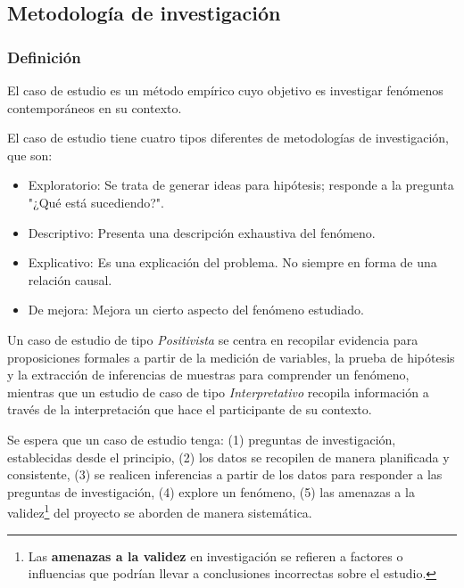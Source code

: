 \subsection{Metodología de investigación}
\subsubsection{Definición}
El caso de estudio es un método empírico cuyo objetivo es investigar fenómenos contemporáneos en su contexto.

El caso de estudio tiene cuatro tipos diferentes de metodologías de investigación, que son:
\begin{itemize}
    \item Exploratorio: Se trata de generar ideas para hipótesis; responde a la pregunta "¿Qué está sucediendo?".
    \item Descriptivo: Presenta una descripción exhaustiva del fenómeno.
    \item Explicativo: Es una explicación del problema.
    No siempre en forma de una relación causal.
    \item De mejora: Mejora un cierto aspecto del fenómeno estudiado.
\end{itemize}

Un caso de estudio de tipo \textit{Positivista} se centra en recopilar evidencia para proposiciones formales a partir de la medición de variables, la prueba de hipótesis y la extracción de inferencias de muestras para comprender un fenómeno, mientras que un estudio de caso de tipo \textit{Interpretativo} recopila información a través de la interpretación que hace el participante de su contexto.

Se espera que un caso de estudio tenga: (1) preguntas de investigación, establecidas desde el principio, (2) los datos se recopilen de manera planificada y consistente, (3) se realicen inferencias a partir de los datos para responder a las preguntas de investigación, (4) explore un fenómeno, (5) las amenazas a la validez\footnote{Las \textbf{amenazas a la validez} en investigación se refieren a factores o influencias que podrían llevar a conclusiones incorrectas sobre el estudio.} del proyecto se aborden de manera sistemática.


